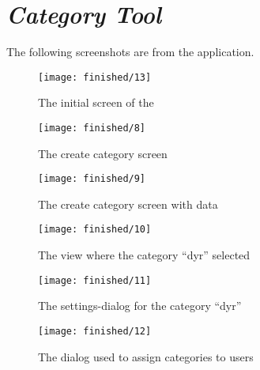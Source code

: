 \section{\emph{Category Tool}}
\label{sec:screenshots_of_category_tool}
The following screenshots are from the \ct application.

\begin{figure}[!htbp]
	\centering
	\texttt{[image: finished/13]}
	\caption{The initial screen of the \ct}
\end{figure}
\FloatBarrier

\begin{figure}[!htbp]
	\centering
	\texttt{[image: finished/8]}
	\caption{The create category screen}
\end{figure}
\FloatBarrier

\begin{figure}[!htbp]
	\centering
	\texttt{[image: finished/9]}
	\caption{The create category screen with data}
\end{figure}
\FloatBarrier

\begin{figure}[!htbp]
	\centering
	\texttt{[image: finished/10]}
	\caption{The view where the category ``dyr'' selected}
\end{figure}
\FloatBarrier

\begin{figure}[!htbp]
	\centering
	\texttt{[image: finished/11]}
	\caption{The settings-dialog for the category ``dyr''}
\end{figure}
\FloatBarrier

\begin{figure}[!htbp]
	\centering
	\texttt{[image: finished/12]}
	\caption{The dialog used to assign categories to users}
\end{figure}
\FloatBarrier